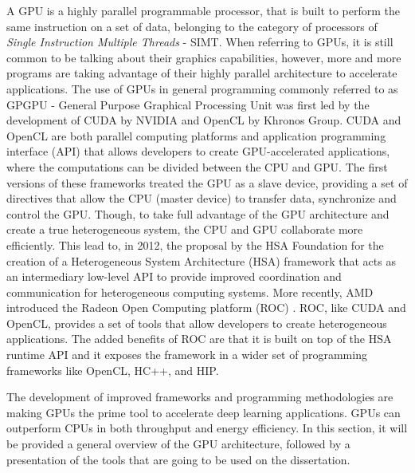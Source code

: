 A GPU is a highly parallel programmable processor, that is built to perform the same instruction on a set of data, belonging to the category of processors of \textit{Single Instruction Multiple Threads} - SIMT. When referring to GPUs, it is still common to be talking about their graphics capabilities, however, more and more programs are taking advantage of their highly parallel architecture to accelerate applications. The use of GPUs in general programming commonly referred to as GPGPU - General Purpose Graphical Processing Unit was first led by the development of CUDA \cite{noauthor_cuda_2017} by NVIDIA and OpenCL \cite{noauthor_opencl_2013} by Khronos Group. CUDA and OpenCL are both parallel computing platforms and application programming interface (API) that allows developers to create GPU-accelerated applications, where the computations can be divided between the CPU and GPU. The first versions of these frameworks treated the GPU as a slave device, providing a set of directives that allow the CPU (master device) to transfer data, synchronize and control the GPU.  Though, to take full advantage of the GPU architecture and create a true heterogeneous system, the CPU and GPU collaborate more efficiently. This lead to, in 2012, the proposal by the HSA Foundation for the creation of a Heterogeneous System Architecture (HSA) \cite{hwu_heterogeneous_2015} framework that acts as an intermediary low-level API to provide improved coordination and communication for heterogeneous computing systems.  More recently, AMD introduced the Radeon Open Computing platform (ROC) \cite{noauthor_radeonopencompute/rocm_2019}. ROC, like CUDA and OpenCL, provides a set of tools that allow developers to create heterogeneous applications. The added benefits of ROC are that it is built on top of the HSA runtime API and it exposes the framework in a wider set of programming frameworks like OpenCL, HC++, and HIP.

The development of improved frameworks and programming methodologies are making GPUs the prime tool to accelerate deep learning applications. GPUs can outperform CPUs in both throughput and energy efficiency. In this section, it will be provided a general overview of the GPU architecture, followed by a presentation of the tools that are going to be used on the dissertation.


